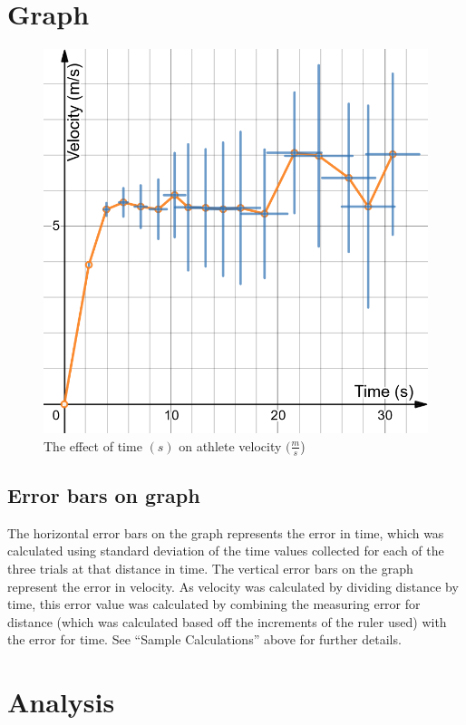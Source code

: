 \documentclass[index]{subfiles}
\begin{document}
\section{Graph}

\begin{figure}[H]
    \centering
    \caption{The effect of time \((s)\) on athlete velocity \((\frac{m}{s}\))}
    \includegraphics[scale=0.3]{pics/velocity-time.png}
\end{figure}


\subsection*{Error bars on graph}

The horizontal error bars on the graph represents the error in time, which was calculated using standard deviation of the time values collected for each of the three trials at that distance in time. The vertical error bars on the graph represent the error in velocity. As velocity was calculated by dividing distance by time, this error value was calculated by combining the measuring error for distance (which was calculated based off the increments of the ruler used) with the error for time. See ``Sample Calculations'' above for further details.

\section{Analysis}
\end{document}
